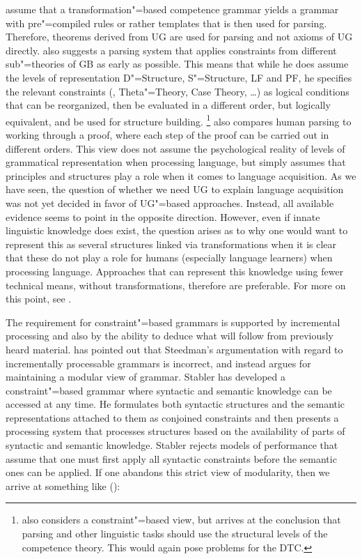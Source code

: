 \citet[]{FC96a-u} assume that a transformation"=based competence grammar yields a grammar with pre"=compiled
rules or rather templates that is then used for parsing.
Therefore, theorems derived from UG are used for parsing and not axioms of UG directly.
\citet{Johnson89a} also suggests a parsing system that applies constraints from different sub"=theories of GB as early as possible.
This means that while he does assume the levels of representation D"=Structure, S"=Structure, LF and PF, he specifies the relevant
constraints (\xbart, Theta"=Theory, Case Theory, \ldots) as logical
conditions that can be reorganized, then be evaluated in a different order, but logically
equivalent, and be used for structure building.%
\footnote{%
\citet[Section~15.7]{Stabler92a-u} also considers a constraint"=based view, but arrives at the conclusion that parsing and other linguistic
tasks should use the structural levels of the competence theory. This would again pose problems for the DTC.%
}
\citet[]{Chomsky2007a} also compares human parsing to working through a proof, where each step of the proof can be carried out in different
orders. This view does not assume the psychological reality of levels of grammatical representation when processing language, but simply assumes
that principles and structures play a role when it comes to language acquisition. 
As we have seen, the question of whether we need UG to explain language acquisition was not yet decided in favor of UG"=based approaches.
Instead, all available evidence seems to point in the opposite direction. However, even if innate linguistic knowledge does exist, the
question arises as to why one would want to represent this as several structures linked via transformations when it is clear that these do not play
a role for humans (especially language learners) when processing language.
Approaches that can represent this knowledge using fewer technical means, \eg without transformations, therefore are preferable.
For more on this point, see .

The requirement for constraint"=based grammars is supported by incremental processing and also by
the ability to deduce what will follow from previously heard material. \cite{Stabler91a} has pointed
out that Steedman's argumentation with regard to incrementally
processable grammars is incorrect, and instead argues for maintaining a modular view of
grammar. Stabler has developed a constraint"=based grammar where syntactic and semantic
knowledge can be accessed at any time. He formulates both syntactic structures and the semantic
representations attached to them as conjoined constraints and then presents a processing system
that processes structures based on the availability of parts of syntactic and semantic
knowledge. Stabler rejects models of performance that assume that one must first apply all syntactic
constraints before the semantic ones can be applied. If one abandons this strict view of modularity,
then we arrive at something like ():

